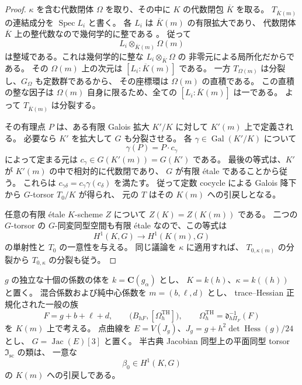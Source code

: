 \begin{proof}
$\kappa$ を含む代数閉体 $\Omega$ を取り、その中に $K$ の代数閉包 $\overline K$ を取る。
$T_{\overline K(m)}$ の連結成分を $\operatorname{Spec}L_i$ と書く。
各 $L_i$ は $\overline K(m)$ の有限拡大であり、
代数閉体 $\overline K$ 上の整代数なので幾何学的に整である
\cite[Lemma~10.49.3, Tag~0FWF]{NFMStacksGeometricIntegral}。
従って
\[
 L_i\otimes_{\overline K(m)}\Omega(m)
\]
は整域である。これは幾何学的に整な $L_i\otimes_{\overline K}\Omega$ の
非零元による局所化だからである。
その $\Omega(m)$ 上の次元は $[L_i:\overline K(m)]$ である。
一方 $T_{\Omega(m)}$ は分裂し、$G_\Omega$ も定数群であるから、
その座標環は $\Omega(m)$ の直積である。
この直積の整な因子は $\Omega(m)$ 自身に限るため、全ての $[L_i:\overline K(m)]$ は一である。
よって $T_{\overline K(m)}$ は分裂する。

その有理点 $P$ は、ある有限 Galois 拡大 $K'/K$ に対して $K'(m)$ 上で定義される。
必要なら $K'$ を拡大して $G$ も分裂させる。
各 $\gamma\in\operatorname{Gal}(K'/K)$ について
\[
 \gamma(P)=P\cdot c_\gamma
\]
によって定まる元は
$c_\gamma\in G(K'(m))=G(K')$ である。
最後の等式は、$K'$ が $K'(m)$ の中で相対的に代数閉であり、
$G$ が有限 \'etale であることから従う。
これらは $c_{\gamma\delta}=c_\gamma\gamma(c_\delta)$ を満たす。
従って定数 cocycle による Galois 降下から $G$-torsor $T_0/K$ が得られ、
元の $T$ はその $K(m)$ への引戻しとなる。

任意の有限 \'etale $K$-scheme $Z$ について
$Z(K)=Z(K(m))$ である。
二つの $G$-torsor の $G$-同変同型空間も有限 \'etale なので、この等式は
\[
 H^1(K,G)\longrightarrow H^1(K(m),G)
\]
の単射性と $T_0$ の一意性を与える。
同じ議論を $\kappa$ に適用すれば、
$T_{0,\kappa(m)}$ の分裂から $T_{0,\kappa}$ の分裂も従う。
\end{proof}

\begin{proposition}
\label{prop:nfm-plane-isom-constant-descent}
$g$ の独立な十個の係数の体を $k=\mathbf C(g_\alpha)$ とし、
$K=k(h)$、$\kappa=k((h))$ と置く。
混合係数および純中心係数を $m=(b,\ell,d)$ とし、
trace--Hessian 正規化された一般の族
\[
 F=g+b+\ell+d,\qquad
 \bigl(B_{hF},[\Omega_h^{\mathrm{TH}}]\bigr),\qquad
 \Omega_h^{\mathrm{TH}}=\mathfrak d_{h\Pi_F}^{-1}(F)
\]
を $K(m)$ 上で考える。
点曲線を $E=V(J_g)$、$J_g=g+h^2\det\operatorname{Hess}(g)/24$ とし、
$G=\operatorname{Jac}(E)[3]$ と置く。
半古典 Jacobian 同型上の平面同型 torsor $\mathfrak I_{\mathrm{sc}}$ の類は、
一意な
\[
 \beta_0\in H^1(K,G)
\]
の $K(m)$ への引戻しである。
\end{proposition}

